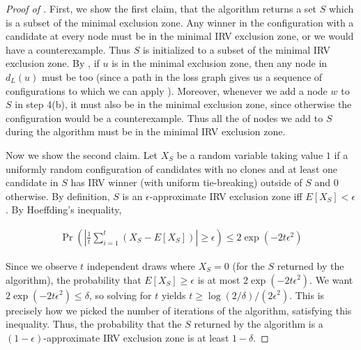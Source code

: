 \documentclass{article}
\theoremstyle{theorem}
\theoremstyle{definition}
\begin{document}
\begin{proof}[Proof of ]


First, we show the first claim, that the algorithm returns a set $S$ which is a subset of the minimal exclusion zone. Any winner in the configuration with a candidate at every node must be in the minimal IRV exclusion zone, or we would have a counterexample. Thus $S$ is initialized to a subset of the minimal IRV exclusion zone. By , if $u$ is in the minimal exclusion zone, then any node in $d_L(u)$ must be too (since a path in the loss graph gives us a sequence of configurations to which we can apply ). Moreover, whenever we add a node $w$ to $S$ in step 4(b), it must also be in the minimal exclusion zone, since otherwise the configuration would be a counterexample. Thus all the of nodes we add to $S$ during the algorithm must be in the minimal IRV exclusion zone. 

  Now we show the second claim. Let $X_S$ be a random variable taking value $1$ if a uniformly random configuration of candidates with no clones and at least one candidate in $S$ has IRV winner (with uniform tie-breaking) outside of $S$ and $0$ otherwise. By definition, $S$ is an $\epsilon$-approximate IRV exclusion zone iff $E[X_S] < \epsilon$. By Hoeffding's inequality,
  
  \begin{align*}
    \Pr\left(\left|\frac{1}{t}\sum_{i = 1}^{t} (X_S - E[X_S]) \right|\ge \epsilon \right) \le 2\exp(- 2 t\epsilon^2 )
  \end{align*}
  
  Since we observe $t$ independent draws where $X_S = 0$ (for the $S$ returned by the algorithm), the probability that $E[X_S]\ge \epsilon$ is at most  $2\exp(- 2 t \epsilon^2 )$. We want $2\exp(- 2 t \epsilon^2 ) \le \delta $, so solving for $t$ yields $t \ge \log(2/\delta)/(2 \epsilon^2)$. This is precisely how we picked the number of iterations of the algorithm, satisfying this inequality. Thus, the probability that the $S$ returned by the algorithm is a $(1-\epsilon)$-approximate IRV exclusion zone is at least $1-\delta$. 
  

\end{proof}
\end{document}
